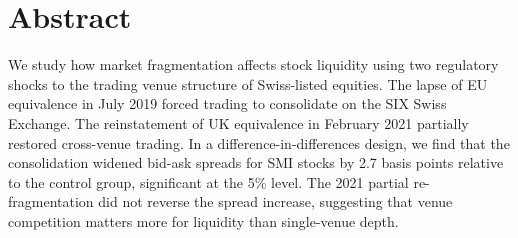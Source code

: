 \section{Abstract}
\label{sec:abstract}

We study how market fragmentation affects stock liquidity using two regulatory shocks to the trading venue structure of Swiss-listed equities. The lapse of EU equivalence in July 2019 forced trading to consolidate on the SIX Swiss Exchange. The reinstatement of UK equivalence in February 2021 partially restored cross-venue trading. In a difference-in-differences design, we find that the consolidation widened bid-ask spreads for SMI stocks by 2.7 basis points relative to the control group, significant at the 5\% level. The 2021 partial re-fragmentation did not reverse the spread increase, suggesting that venue competition matters more for liquidity than single-venue depth.